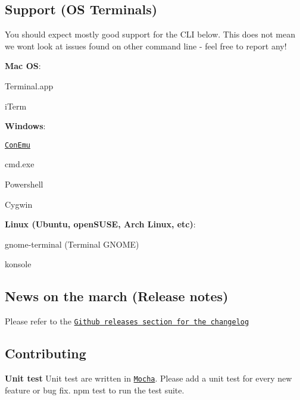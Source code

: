 \subsection*{Support (OS Terminals)}

\label{_support}%


You should expect mostly good support for the C\+LI below. This does not mean we won\textquotesingle{}t look at issues found on other command line -\/ feel free to report any!


\begin{DoxyItemize}
\item {\bfseries Mac OS}\+:
\begin{DoxyItemize}
\item Terminal.\+app
\item i\+Term
\end{DoxyItemize}
\item {\bfseries Windows}\+:
\begin{DoxyItemize}
\item \href{https://conemu.github.io/}{\tt Con\+Emu}
\item cmd.\+exe
\item Powershell
\item Cygwin
\end{DoxyItemize}
\item {\bfseries Linux (Ubuntu, open\+S\+U\+SE, Arch Linux, etc)}\+:
\begin{DoxyItemize}
\item gnome-\/terminal (Terminal G\+N\+O\+ME)
\item konsole
\end{DoxyItemize}
\end{DoxyItemize}

\subsection*{News on the march (Release notes)}

\label{_news}%


Please refer to the \href{https://github.com/SBoudrias/Inquirer.js/releases}{\tt Github releases section for the changelog}

\subsection*{Contributing}

\label{_contributing}%


{\bfseries Unit test} Unit test are written in \href{https://mochajs.org/}{\tt Mocha}. Please add a unit test for every new feature or bug fix. {\ttfamily npm test} to run the test suite.


